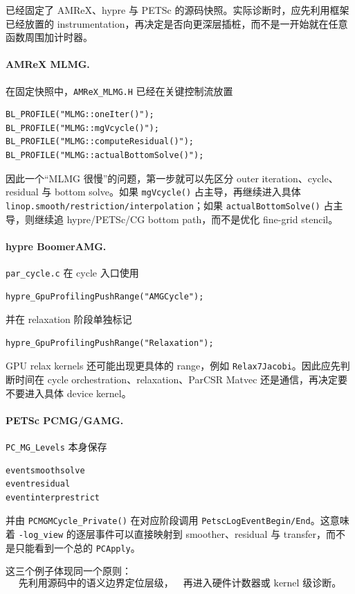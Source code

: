 已经固定了 AMReX、hypre 与 PETSc 的源码快照。实际诊断时，应先利用框架已经放置的 instrumentation，再决定是否向更深层插桩，而不是一开始就在任意函数周围加计时器。

\paragraph{AMReX MLMG.}
在固定快照中，\texttt{AMReX\_MLMG.H} 已经在关键控制流放置
\begin{verbatim}
BL_PROFILE("MLMG::oneIter()");
BL_PROFILE("MLMG::mgVcycle()");
BL_PROFILE("MLMG::computeResidual()");
BL_PROFILE("MLMG::actualBottomSolve()");
\end{verbatim}
因此一个“MLMG 很慢”的问题，第一步就可以先区分 outer iteration、cycle、residual 与 bottom solve。如果 \texttt{mgVcycle()} 占主导，再继续进入具体 \texttt{linop.smooth/restriction/interpolation}；如果 \texttt{actualBottomSolve()} 占主导，则继续追 hypre/PETSc/CG bottom path，而不是优化 fine-grid stencil。

\paragraph{hypre BoomerAMG.}
\texttt{par\_cycle.c} 在 cycle 入口使用
\begin{verbatim}
hypre_GpuProfilingPushRange("AMGCycle");
\end{verbatim}
并在 relaxation 阶段单独标记
\begin{verbatim}
hypre_GpuProfilingPushRange("Relaxation");
\end{verbatim}
GPU relax kernels 还可能出现更具体的 range，例如 \texttt{Relax7Jacobi}。因此应先判断时间在 cycle orchestration、relaxation、ParCSR Matvec 还是通信，再决定要不要进入具体 device kernel。

\paragraph{PETSc PCMG/GAMG.}
\texttt{PC\_MG\_Levels} 本身保存
\begin{verbatim}
eventsmoothsolve
eventresidual
eventinterprestrict
\end{verbatim}
并由 \texttt{PCMGMCycle\_Private()} 在对应阶段调用 \texttt{PetscLogEventBegin/End}。这意味着 \texttt{-log\_view} 的逐层事件可以直接映射到 smoother、residual 与 transfer，而不是只能看到一个总的 \texttt{PCApply}。

这三个例子体现同一个原则：
\begin{equation}
\boxed{
\text{先利用源码中的语义边界定位层级，}
\quad
\text{再进入硬件计数器或 kernel 级诊断。}
}
\label{eq:diagnosis-source-first}
\end{equation}

